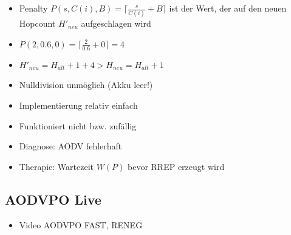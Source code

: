 \documentclass[11pt,handout,notes=only]{beamer}
\begin{document}
\begin{frame}{\insertsubsection}
\begin{itemize}
\item Penalty $P(s,C(i),B) = \lceil\frac{s}{C(i)} + B\rceil$ ist der Wert, der auf den neuen Hopcount $H'_{neu}$ aufgeschlagen wird\newline
\item $P(2,0.6,0) = \lceil\frac{2}{0.6} + 0\rceil = 4$\newline
\item $H'_{neu} = H_{alt} + 1 + 4 > H_{neu} = H_{alt} + 1$\newline
\item Nulldivision unmöglich (Akku leer!)
\end{itemize}
\end{frame}

\begin{frame}{\insertsubsection}
\begin{itemize}
\item Implementierung relativ einfach\newline
\item Funktioniert nicht bzw. zufällig\newline
\item Diagnose: AODV fehlerhaft\newline
\item Therapie: Wartezeit $W(P)$ bevor RREP erzeugt wird
\end{itemize}
\end{frame}


\subsection{AODVPO Live}

\begin{frame}{\insertsubsection}
\begin{itemize}
\item Video AODVPO FAST, RENEG
\end{itemize}
\end{frame}
\end{document}

